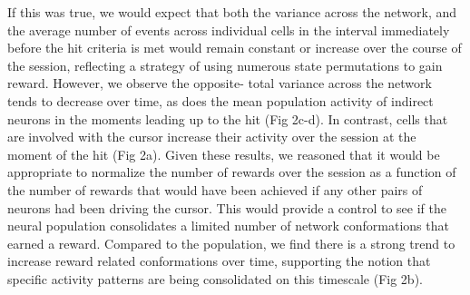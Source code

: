 \documentclass[letterpaper, 10 pt, conference]{ieeeconf}  %
\begin{document}
	If this was true, we would expect that both the variance across the network, and the average number of events across individual cells in the interval immediately before the hit criteria is met would remain constant or increase over the course of the session, reflecting a strategy of using numerous state permutations to gain reward. However, we observe the opposite- total variance across the network tends to decrease over time, as does the mean population activity of indirect neurons in the moments leading up to the hit (Fig 2c-d). In contrast,  cells that are involved with the cursor increase their activity over the session at the moment of the hit (Fig 2a). Given these results, we reasoned that it would be appropriate to normalize the number of rewards over the session as a function of the number of rewards that would have been achieved if any other pairs of neurons had been driving the cursor. This would provide a control to see if the neural population consolidates a limited number of network conformations that earned a reward. Compared to the population, we find there is a strong trend to increase reward related conformations over time, supporting the notion that specific activity patterns are being consolidated on this timescale (Fig 2b). 
\end{document}
